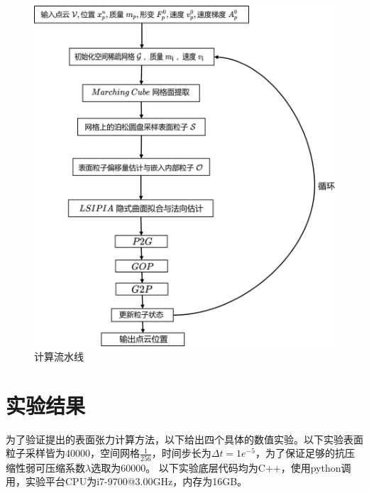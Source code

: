 \begin{figure}[htbp]
    \centering
    \includegraphics[scale=0.7]{./images/image17.png}
    \caption[计算流水线]{计算流水线}
    \label{fig: pipline}
\end{figure}
\section{实验结果}
为了验证提出的表面张力计算方法，以下给出四个具体的数值实验。以下实验表面粒子采样皆为40000，空间网格$\frac{1}{256}$，时间步长为$\Delta t = 1e^{-5}$，为了保证足够的抗压缩性弱可压缩系数$\lambda$选取为$60000$。
以下实验底层代码均为C++，使用python调用，实验平台CPU为i7-9700@3.00GHz，内存为16GB。
